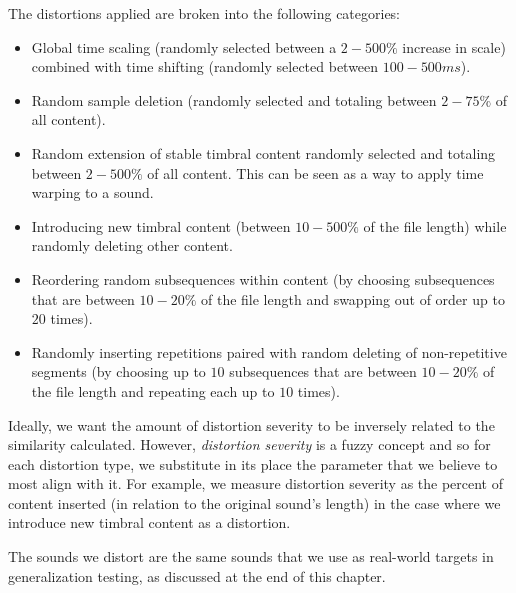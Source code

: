 \documentclass[12pt]{report} 	%
\numberwithin{figure}{chapter}
\numberwithin{table}{chapter}
\numberwithin{equation}{chapter}
\begin{document}
\begin{flushleft}
The distortions applied are broken into the following categories:
\begin{itemize}
\item Global time scaling (randomly selected between a $2-500\%$ increase in scale) combined with time shifting (randomly selected between $100-500ms$).
\item Random sample deletion (randomly selected and totaling between $2-75\%$ of all content).
\item Random extension of stable timbral content randomly selected and totaling between $2-500\%$ of all content. This can be seen as a way to apply time warping to a sound.
\item Introducing new timbral content (between $10-500\%$ of the file length) while randomly deleting other content.
\item Reordering random subsequences within content (by choosing subsequences that are between $10-20\%$ of the file length and swapping out of order up to $20$ times).
\item Randomly inserting repetitions paired with random deleting of non-repetitive segments (by choosing up to $10$ subsequences that are between $10-20\%$ of the file length and repeating each up to $10$ times).
\end{itemize}

Ideally, we want the amount of distortion severity to be inversely related to the similarity calculated. However, \textit{distortion severity} is a fuzzy concept and so for each distortion type, we substitute in its place the parameter that we believe to most align with it. For example, we measure distortion severity as the percent of content inserted (in relation to the original sound's length) in the case where we introduce new timbral content as a distortion.

The sounds we distort are the same sounds that we use as real-world targets in generalization testing, as discussed at the end of this chapter.


\end{flushleft}
\end{document}
